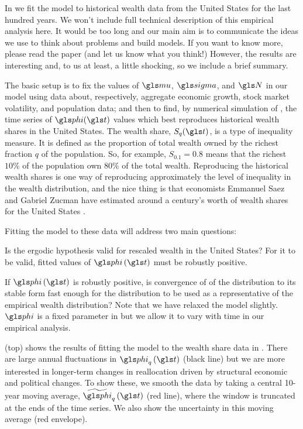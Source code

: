 In \cite{BermanPetersAdamou2019} we fit the \RGBM model to historical wealth data from the United States for the last hundred years. We won't include full technical description of this empirical analysis here. It would be too long and our main aim is to communicate the ideas we use to think about problems and build models. If you want to know more, please read the paper (and let us know what you think!) However, the results are interesting and, to us at least, a little shocking, so we include a brief summary.

The basic setup is to fix the values of $\gmu$, $\gsigma$, and $\N$ in our \RGBM model using data about, respectively, aggregate economic growth, stock market volatility, and population data; and then to find, by numerical simulation of , the time series of $\gphi(\t)$ values which best reproduces historical wealth shares in the United States. The wealth share, $S_q(\t)$, is a type of inequality measure. It is defined as the proportion of total wealth owned by the richest fraction $q$ of the population. So, for example, $S_{0.1}=0.8$ means that the richest $10\%$ of the population own $80\%$ of the total wealth. Reproducing the historical wealth shares is one way of reproducing approximately the level of inequality in the wealth distribution, and the nice thing is that economists Emmanuel Saez and Gabriel Zucman have estimated around a century's worth of wealth shares for the United States \cite{SaezZucman2016}.

Fitting the model to these data will address two main questions:
\bi
\item Is the ergodic hypothesis valid for rescaled wealth in the United States? For it to be valid, fitted values of $\gphi\left(\t\right)$ must be robustly positive.
\item If $\gphi\left(\t\right)$ is robustly positive, is convergence of of the distribution to its stable form fast enough for the distribution to be used as a representative of the empirical wealth distribution?
\ei
Note that we have relaxed the model slightly. $\gphi$ is a fixed parameter in  but we allow it to vary with time in our empirical analysis.

 (top) shows the results of fitting the \RGBM model to the wealth share data in \cite{SaezZucman2016}. There are large annual fluctuations in $\gphi_q\left(\t\right)$ (black line) but we are more interested in longer-term changes in reallocation driven by structural economic and political changes. To show these, we smooth the data by taking a central 10-year moving average, $\widetilde{\gphi}_q\left(\t\right)$ (red line), where the window is truncated at the ends of the time series. We also show the uncertainty in this moving average (red envelope).

